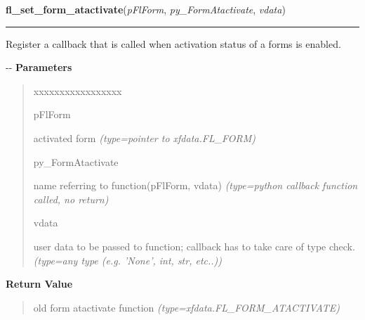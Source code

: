     \label{xformslib:flbasic:fl_set_form_atactivate}

    \vspace{0.5ex}

\hspace{.8\funcindent}\begin{boxedminipage}{\funcwidth}

    \raggedright \textbf{fl\_set\_form\_atactivate}(\textit{pFlForm}, \textit{py\_FormAtactivate}, \textit{vdata})

    \vspace{-1.5ex}

    \rule{\textwidth}{0.5\fboxrule}
\setlength{\parskip}{2ex}

Register a callback that is called when activation status of a forms
is enabled.

-{}-
\setlength{\parskip}{1ex}
      \textbf{Parameters}
      \vspace{-1ex}

      \begin{quote}
        \begin{Ventry}{xxxxxxxxxxxxxxxxx}

          \item[pFlForm]


activated form
            {\it (type=pointer to xfdata.FL\_FORM)}

          \item[py\_FormAtactivate]


name referring to function(pFlForm, vdata)
            {\it (type=python callback function called, no return)}

          \item[vdata]


user data to be passed to function; callback has to take care of
type check.
            {\it (type=any type (e.g. 'None', int, str, etc..))}

        \end{Ventry}

      \end{quote}

      \textbf{Return Value}
    \vspace{-1ex}

      \begin{quote}

old form atactivate function
      {\it (type=xfdata.FL\_FORM\_ATACTIVATE)}


\end{quote}
\end{boxedminipage}
